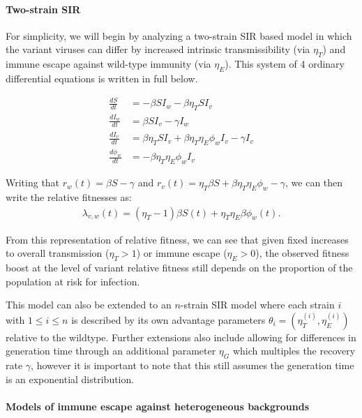 \documentclass[12pt,oneside,letterpaper]{article}
\begin{document}
\paragraph{Two-strain SIR}%

For simplicity, we will begin by analyzing a two-strain SIR based model in which the variant viruses can differ by increased intrinsic transmissibility (via $\eta_{T}$) and immune escape against wild-type immunity (via $\eta_{E}$).
This system of 4 ordinary differential equations is written in full below.

\begin{align*}
    \frac{d S}{d t} &= - \beta S I_{w} - \beta \eta_{T} S I_{v}\\ 
    \frac{d I_{w}}{dt} &= \beta S I_{v} - \gamma I_{w}\\
    \frac{d I_{v}}{dt} &= \beta \eta_{T} S I_{v} + \beta \eta_{T} \eta_{E} \phi_{w} I_{v} - \gamma I_{v}\\
    \frac{d \phi_{w}}{dt} &= - \beta \eta_{T} \eta_{E} \phi_{w} I_{v}
\end{align*}

Writing that $r_{w}(t) = \beta S - \gamma$ and $r_{v}(t) = \eta_{T} \beta  S + \beta \eta_{T} \eta_{E} \phi_{w} - \gamma$, we can then write the relative fitnesses as:
\begin{align*}
\lambda_{v,w}(t) = (\eta_{T} - 1)\beta S(t) + \eta_{T} \eta_{E} \beta \phi_{w}(t).
\end{align*}

From this representation of relative fitness, we can see that given fixed increases to overall transmission ($\eta_{T} > 1$) or immune escape ($\eta_{E} > 0$), the observed fitness boost at the level of variant relative fitness still depends on the proportion of the population at risk for infection.

This model can also be extended to an $n$-strain SIR model where each strain $i$ with $1\leq i \leq n$ is described by its own advantage parameters $\theta_{i} = (\eta_{T}^{(i)},\eta_{E}^{(i)})$  relative to the wildtype.
Further extensions also include allowing for differences in generation time through an additional parameter $\eta_{G}$ which multiples the recovery rate $\gamma$, however it is important to note that this still assumes the generation time is an exponential distribution.


\paragraph{Models of immune escape against heterogeneous backgrounds}%
\end{document}

